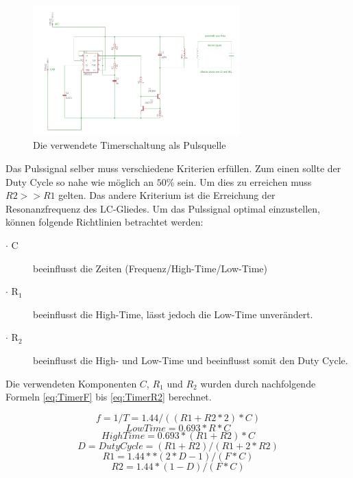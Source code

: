 \begin{figure}[H]
	\begin{center}
		\includegraphics[width=80mm]{data/Tranceiver.png}
		\caption[Ne555]{Die verwendete Timerschaltung als Pulsquelle} %
		\label{fig:Tranceiver-Schaltung}
	\end{center}
\end{figure}
 
Das Pulssignal selber muss verschiedene Kriterien erfüllen. Zum einen sollte der Duty Cycle so nahe wie möglich an $50\%$ sein. Um dies zu erreichen muss $R2 >> R1$ gelten. Das andere Kriterium ist die Erreichung der Resonanzfrequenz des LC-Gliedes. Um das Pulssignal optimal einzustellen, können folgende Richtlinien betrachtet werden:
\begin{description}
	\item [$\cdot$ C] beeinflusst die Zeiten (Frequenz/High-Time/Low-Time)
	\item [$\cdot$ R$_{1}$] beeinflusst die High-Time, lässt jedoch die Low-Time unverändert.
	\item [$\cdot$ R$_{2}$ ] beeinflusst die High- und Low-Time und beeinflusst somit den Duty Cycle.
\end{description}

Die verwendeten Komponenten $C$, $R_{1}$ und $R_{2}$ wurden durch nachfolgende Formeln \ref{eq:TimerF} bis \ref{eq:TimerR2} berechnet. 

\begin{equation}\label{eq: Timer555 F}
f=1/T= 1.44/((R1+R2*2)*C)
\end{equation}
\begin{equation}\label{eq: Timer555 TL}
Low Time= 0.693*R*C
\end{equation}
\begin{equation}\label{eq: Timer555 TH}
High Time= 0.693*(R1+R2)*C
\end{equation}
\begin{equation}\label{eq: Timer555 D}
D= Duty Cycle= (R1+R2)/(R1+2*R2)
\end{equation}
\begin{equation}\label{eq: Timer555 R1}
R1= 1.44**(2*D-1)/(F*C)
\end{equation}
\begin{equation}\label{eq: Timer555 R2}
R2= 1.44*(1-D)/(F*C)
\end{equation} 

